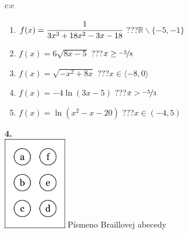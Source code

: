 \documentclass[10pt]{report}
\begin{document}
\begin{tabular}{c:c}
\begin{minipage}[c][99mm][t]{0.49\linewidth}
\begin{center}
\begin{minipage}{0.77\linewidth}
\begin{center}
\begin{varwidth}{\textwidth}
\begin{enumerate}
\item $f(x)=\cfrac{1}{3x^3+18x^2-3x-18}$\quad \dotfill\; ???\;\dotfill \quad $\mathbb{R}\smallsetminus\{-5,-1\}$
\item $f(x)=6\sqrt{8x-5}$\quad \dotfill\; ???\;\dotfill \quad $x\geq\nicefrac{-5}{8}$
\item $f(x)=\sqrt{-x^2+8x}$\quad \dotfill\; ???\;\dotfill \quad $x\in\langle-8 , 0\rangle$
\item $f(x)=-4\ln{(3x-5)}$\quad \dotfill\; ???\;\dotfill \quad $x>\nicefrac{-5}{3}$
\item $f(x)=\ln{(x^2-x-20)}$\quad \dotfill\; ???\;\dotfill \quad $x\in(-4 , 5)$
\end{enumerate}
\end{varwidth}
\end{center}
\end{minipage}
\begin{minipage}{0.20\linewidth}
\begin{center}
{\Huge\bfseries 4.} \\[2mm]
\includegraphics[height=40mm]{../images/braille.png}
{\small Písmeno Braillovej abecedy}
\end{center}
\end{minipage}
\end{center}
\end{minipage}
%
\end{tabular}
\newpage
\thispagestyle{empty}
\end{document}
